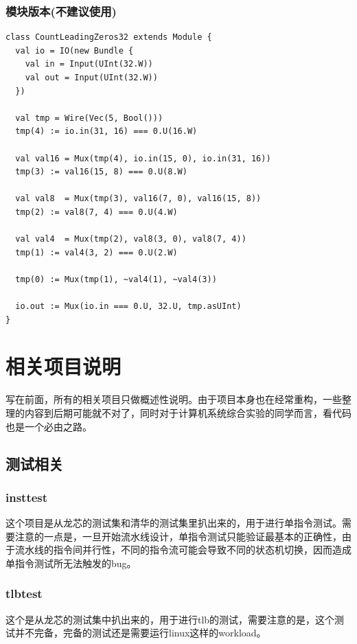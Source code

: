 \documentclass[lang=cn,11pt,a4paper]{elegantpaper}
\begin{document}
\subsubsection{模块版本(不建议使用)}

\begin{lstlisting}
class CountLeadingZeros32 extends Module {
  val io = IO(new Bundle {
    val in = Input(UInt(32.W))
    val out = Input(UInt(32.W))
  })

  val tmp = Wire(Vec(5, Bool()))
  tmp(4) := io.in(31, 16) === 0.U(16.W)

  val val16 = Mux(tmp(4), io.in(15, 0), io.in(31, 16))
  tmp(3) := val16(15, 8) === 0.U(8.W)

  val val8  = Mux(tmp(3), val16(7, 0), val16(15, 8))
  tmp(2) := val8(7, 4) === 0.U(4.W)

  val val4  = Mux(tmp(2), val8(3, 0), val8(7, 4))
  tmp(1) := val4(3, 2) === 0.U(2.W)

  tmp(0) := Mux(tmp(1), ~val4(1), ~val4(3))

  io.out := Mux(io.in === 0.U, 32.U, tmp.asUInt)
}
\end{lstlisting}

\section{相关项目说明}

写在前面，所有的相关项目只做概述性说明。由于项目本身也在经常重构，一些整理的内容到后期可能就不对了，同时对于计算机系统综合实验的同学而言，看代码也是一个必由之路。

\subsection{测试相关}

\subsubsection{insttest}
这个项目是从龙芯的测试集和清华的测试集里扒出来的，用于进行单指令测试。需要注意的一点是，一旦开始流水线设计，单指令测试只能验证最基本的正确性，由于流水线的指令间并行性，不同的指令流可能会导致不同的状态机切换，因而造成单指令测试所无法触发的bug。
\subsubsection{tlbtest}
这个是从龙芯的测试集中扒出来的，用于进行tlb的测试，需要注意的是，这个测试并不完备，完备的测试还是需要运行linux这样的workload。
\end{document}

